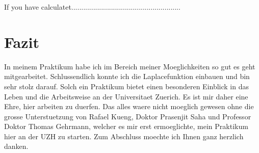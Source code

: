 \documentclass[pdftex,12pt,a4paper]{article}
\begin{document}
If you have calculatet.......................................................

\section{Fazit}
In meinem Praktikum habe ich im Bereich meiner Moeglichkeiten so gut es geht mitgearbeitet.
Schlussendlich konnte ich die Laplacefunktion einbauen und bin sehr stolz darauf.
Solch ein Praktikum bietet einen besonderen Einblick in das Leben und die Arbeitsweise an der Universitaet Zuerich.
Es ist mir daher eine Ehre, hier arbeiten zu duerfen.
Das alles waere nicht moeglich gewesen ohne die grosse Unterstuetzung von Rafael Kueng, Doktor Prasenjit Saha und Professor Doktor Thomas Gehrmann,
welcher es mir erst ermoeglichte, mein Praktikum hier an der UZH zu starten.
Zum Abschluss moechte ich Ihnen ganz herzlich danken.
\end{document}
